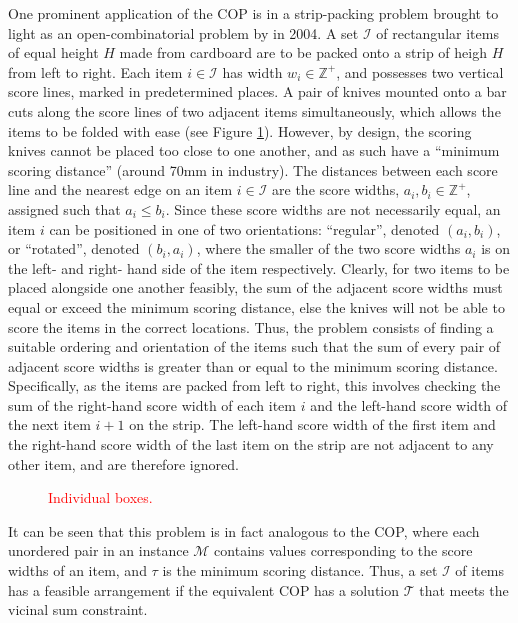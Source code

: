 \documentclass[oribibl]{llncs}
\begin{document}
One prominent application of the COP is in a strip-packing problem brought to light as an open-combinatorial problem by \citeauthor{goulimis2004} in 2004. A set $\mathcal{I}$ of rectangular items of equal height $H$ made from cardboard are to be packed onto a strip of heigh $H$ from left to right. Each item $i \in \mathcal{I}$ has width $w_i \in \mathbb{Z}^{+}$, and possesses two vertical score lines, marked in predetermined places. A pair of knives mounted onto a bar cuts along the score lines of two adjacent items simultaneously, which allows the items to be folded with ease (see Figure \ref{fig:boxknife}). However, by design, the scoring knives cannot be placed too close to one another, and as such have a ``minimum scoring distance'' (around 70mm in industry). The distances between each score line and the nearest edge on an item $i \in \mathcal{I}$ are the score widths, $a_i, b_i \in \mathbb{Z}^{+}$, assigned such that $a_i \leq b_i$. Since these score widths are not necessarily equal, an item $i$ can be positioned in one of two orientations: ``regular'', denoted $(a_i, b_i)$, or ``rotated'', denoted $(b_i, a_i)$, where the smaller of the two score widths $a_i$ is on the left- and right- hand side of the item respectively. Clearly, for two items to be placed alongside one another feasibly, the sum of the adjacent score widths must equal or exceed the minimum scoring distance, else the knives will not be able to score the items in the correct locations. Thus, the problem consists of finding a suitable ordering and orientation of the items such that the sum of every pair of adjacent score widths is greater than or equal to the minimum scoring distance. Specifically, as the items are packed from left to right, this involves checking the sum of the right-hand score width of each item $i$ and the left-hand score width of the next item $i+1$ on the strip. The left-hand score width of the first item and the right-hand score width of the last item on the strip are not adjacent to any other item, and are therefore ignored. 


\begin{figure}[h!]	
	\centering
	
	\caption{\textcolor{red}{Individual boxes.}}	
	\label{fig:boxknife}
\end{figure}

It can be seen that this problem is in fact analogous to the COP, where each unordered pair in an instance $\mathcal{M}$ contains values corresponding to the score widths of an item, and $\tau$ is the minimum scoring distance. Thus, a set $\mathcal{I}$ of items has a feasible arrangement if the equivalent COP has a solution $\mathcal{T}$ that meets the vicinal sum constraint.
\end{document}
